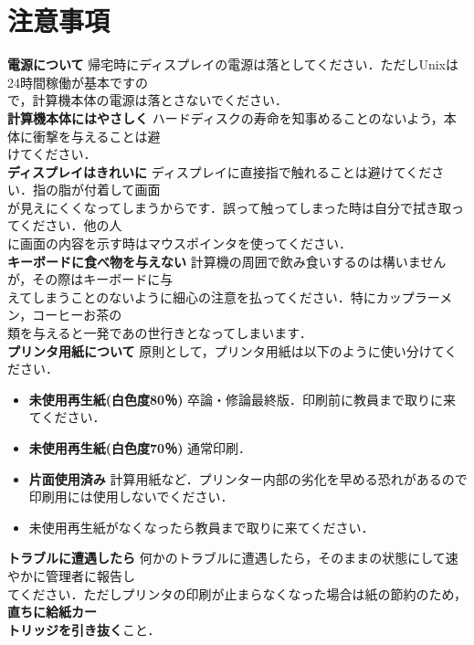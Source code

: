 \documentclass[main]{subfiles}
\begin{document}
\chapter{注意事項}

\fontsize{10}{10} \selectfont
\noindent
\textbf{電源について} 帰宅時にディスプレイの電源は落としてください．ただしUnixは24時間稼働が基本ですの\\
\hspace{2em}で，計算機本体の電源は落とさないでください．\\

\noindent
\textbf{計算機本体にはやさしく} ハードディスクの寿命を知事めることのないよう，本体に衝撃を与えることは避\\
\hspace{2em}けてください．\\

\noindent
\textbf{ディスプレイはきれいに}  ディスプレイに直接指で触れることは避けてください．指の脂が付着して画面\\
\hspace{2em}が見えにくくなってしまうからです．誤って触ってしまった時は自分で拭き取ってください．他の人\\
\hspace{2em}に画面の内容を示す時はマウスポインタを使ってください．\\

\noindent
\textbf{キーボードに食べ物を与えない} 計算機の周囲で飲み食いするのは構いませんが，その際はキーボードに与\\
\hspace{2em}えてしまうことのないように細心の注意を払ってください．特にカップラーメン，コーヒーお茶の\\
\hspace{2em}類を与えると一発であの世行きとなってしまいます．\\

\noindent
\textbf{プリンタ用紙について} 原則として，プリンタ用紙は以下のように使い分けてください．
\begin{itemize}
    \renewcommand{\labelitemi}{}
    \setlength{\itemsep}{0.7zw}         %
    \item \textbf{未使用再生紙(白色度80％)} 卒論・修論最終版．印刷前に教員まで取りに来てください．
    \item \textbf{未使用再生紙(白色度70％)} 通常印刷．
    \item \textbf{片面使用済み} 計算用紙など．プリンター内部の劣化を早める恐れがあるので印刷用には使用しないでください．
    \item 未使用再生紙がなくなったら教員まで取りに来てください．
\end{itemize}

\noindent
\textbf{トラブルに遭遇したら} 何かのトラブルに遭遇したら，そのままの状態にして速やかに管理者に報告し\\
\hspace{2em}てください．ただしプリンタの印刷が止まらなくなった場合は紙の節約のため，\textbf{直ちに給紙カー}\\
\hspace{2em}\textbf{トリッジを引き抜く}こと．
\end{document}
